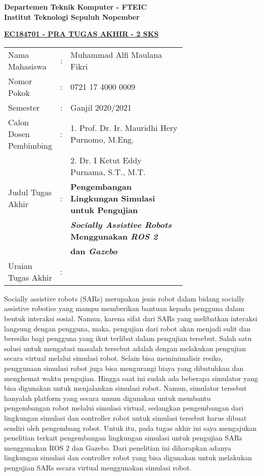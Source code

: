\begin{flushleft}
  \textbf{Departemen Teknik Komputer - FTEIC}\\
  \textbf{Institut Teknologi Sepuluh Nopember}\\
\end{flushleft}

\begin{center}
  \underline{\textbf{EC184701 - PRA TUGAS AKHIR - 2 SKS}}
\end{center}

\begin{adjustwidth}{-0.2cm}{}
  \begin{tabular}{lcp{0.7\linewidth}}

    Nama Mahasiswa &:& Muhammad Alfi Maulana Fikri \\
    Nomor Pokok &:&	0721 17 4000 0009 \\

    Semester &:& Ganjil 2020/2021 \\

    Calon Dosen Pembimbing &:& 1. Prof. Dr. Ir. Mauridhi Hery Purnomo, M.Eng. \\
    & & 2. Dr. I Ketut Eddy Purnama, S.T., M.T. \\

    Judul Tugas Akhir &:& \textbf{Pengembangan Lingkungan Simulasi untuk Pengujian} \\
    & & \textbf{\emph{Socially Assistive Robots} Menggunakan \emph{ROS 2}} \\
    & & \textbf{dan \emph{Gazebo}} \\

    Uraian Tugas Akhir &:& \\
  \end{tabular}
\end{adjustwidth}

Socially assistive robots (SARs) merupakan jenis robot dalam bidang socially assistive robotics yang mampu memberikan bantuan kepada pengguna dalam bentuk interaksi sosial.
Namun, karena sifat dari SARs yang melibatkan interaksi langsung dengan pengguna, maka, pengujian dari robot akan menjadi sulit dan beresiko bagi pengguna yang ikut terlibat dalam pengujian tersebut.
Salah satu solusi untuk mengatasi masalah tersebut adalah dengan melakukan pengujian secara virtual melalui simulasi robot.
Selain bisa meminimalisir resiko, penggunaan simulasi robot juga bisa mengurangi biaya yang dibutuhkan dan menghemat waktu pengujian.
Hingga saat ini sudah ada beberapa simulator yang bisa digunakan untuk menjalankan simulasi robot.
Namun, simulator tersebut hanyalah platform yang secara umum digunakan untuk membantu pengembangan robot melalui simulasi virtual, sedangkan pengembangan dari lingkungan simulasi dan controller robot untuk simulasi tersebut harus dibuat sendiri oleh pengembang robot.
Untuk itu, pada tugas akhir ini saya mengajukan penelitian terkait pengembangan lingkungan simulasi untuk pengujian SARs menggunakan ROS 2 dan Gazebo.
Dari penelitian ini diharapkan adanya lingkungan simulasi dan controller robot yang bisa digunakan untuk melakukan pengujian SARs secara virtual menggunakan simulasi robot.
\vspace{1ex}

